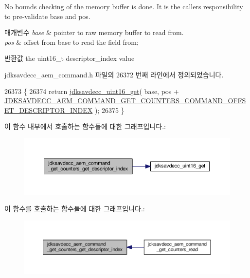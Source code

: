 No bounds checking of the memory buffer is done. It is the caller\textquotesingle{}s responsibility to pre-\/validate base and pos.


\begin{DoxyParams}{매개변수}
{\em base} & pointer to raw memory buffer to read from. \\
\hline
{\em pos} & offset from base to read the field from; \\
\hline
\end{DoxyParams}
\begin{DoxyReturn}{반환값}
the uint16\+\_\+t descriptor\+\_\+index value 
\end{DoxyReturn}


jdksavdecc\+\_\+aem\+\_\+command.\+h 파일의 26372 번째 라인에서 정의되었습니다.


\begin{DoxyCode}
26373 \{
26374     \textcolor{keywordflow}{return} \hyperlink{group__endian_ga3fbbbc20be954aa61e039872965b0dc9}{jdksavdecc\_uint16\_get}( base, pos + 
      \hyperlink{group__command__get__counters_ga415d576ca1be675a11bcab093c320a74}{JDKSAVDECC\_AEM\_COMMAND\_GET\_COUNTERS\_COMMAND\_OFFSET\_DESCRIPTOR\_INDEX}
       );
26375 \}
\end{DoxyCode}


이 함수 내부에서 호출하는 함수들에 대한 그래프입니다.\+:
\nopagebreak
\begin{figure}[H]
\begin{center}
\leavevmode
\includegraphics[width=350pt]{group__command__get__counters_gae010422d16acdfde787c2b6467165bf7_cgraph}
\end{center}
\end{figure}




이 함수를 호출하는 함수들에 대한 그래프입니다.\+:
\nopagebreak
\begin{figure}[H]
\begin{center}
\leavevmode
\includegraphics[width=350pt]{group__command__get__counters_gae010422d16acdfde787c2b6467165bf7_icgraph}
\end{center}
\end{figure}



